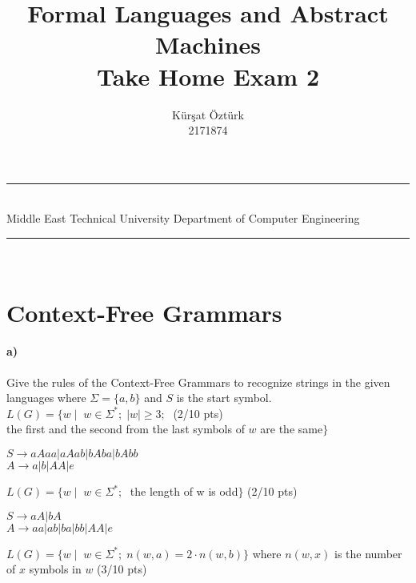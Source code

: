 \documentclass[a4paper,12pt]{article}
\title{Formal Languages and Abstract Machines \\ Take Home Exam 2}
\author{Kürşat Öztürk \\ 2171874} %
\date{} %
\newcommand{\HRule}{\rule{\linewidth}{1mm}}
\begin{document}
\HRule\\
Middle East Technical University \hfill Department of Computer Engineering
{\let\newpage\relax\maketitle}
\HRule\\
\vspace{1cm}


\section{Context-Free Grammars \hfill {}}

\paragraph{a)} Give the rules of the Context-Free Grammars to recognize strings in the given languages where $\Sigma=\{a,b\}$ and $S$ is the start symbol. \\  

$L(G)=\{w \mid \;  w \in \Sigma^*;\; |w| \geq 3;\; $  \hfill \small{(2/10 pts)} \\
\hspace*{22mm} the first and the second from the last symbols of $w$ are the same$\}$ \\

\begin{tcolorbox}
$S \rightarrow aAaa | aAab |  bAba | bAbb $\\
$A \rightarrow a | b | AA | e $ \\

\end{tcolorbox}


$L(G)=\{w \mid \;  w \in \Sigma^*;\; $ the length of w is odd$\}$ \hfill \small{(2/10 pts)} \\

\begin{tcolorbox}

$S \rightarrow aA | bA $\\
$A \rightarrow aa| ab| ba| bb| AA | e $\\


\end{tcolorbox}


$L(G)=\{w \mid \;  w \in \Sigma^*;\; n(w,a)=2\cdot n(w,b)\}$ where $n(w,x)$ is the number of $x$ symbols in $w$ \hfill \small{(3/10 pts)} \\
\end{document}
